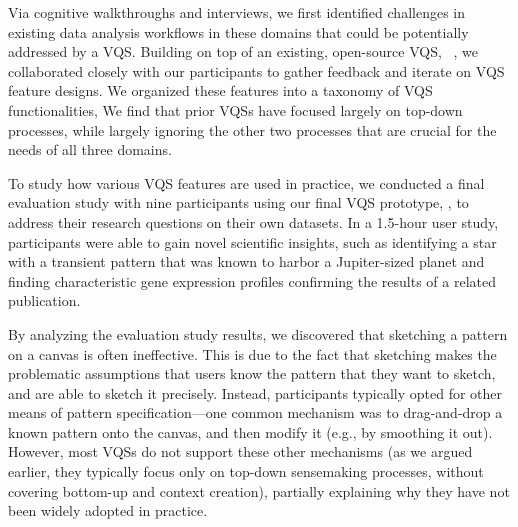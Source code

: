 \par Via cognitive walkthroughs and interviews, we first identified challenges in existing data analysis workflows in these domains
that could be potentially addressed by a VQS. Building on top of an existing, open-source VQS, \zv~\cite{Siddiqui2017,Siddiqui2017VLDB}, we collaborated closely with our participants to gather feedback and iterate on VQS feature designs. We organized these features into a taxonomy of VQS functionalities,  We find that prior VQSs have focused largely on top-down processes, while largely ignoring the other two processes that are crucial for the needs of all three domains.

\par 
To study how various VQS features 
are used in practice, 
we conducted a final evaluation study with nine participants 
using our final VQS prototype, \zvpp, 
to address their research questions 
on their own datasets. 
In a 1.5-hour user study, participants were able to 
gain novel scientific insights, 
such as identifying a star with a transient pattern 
that was known to harbor a Jupiter-sized planet 
and finding characteristic gene expression profiles confirming the results of a related publication.  

\par By analyzing the evaluation study results, 
we discovered that sketching a pattern on a canvas
is often ineffective. 
This is due to the fact that sketching makes the problematic
assumptions that 
users know the pattern that they want to sketch,
and are able to sketch it precisely. 
Instead, participants typically
opted for other means of pattern specification---one
common mechanism was to drag-and-drop a known pattern
onto the canvas,
and then modify it (e.g., by smoothing it out).
However, most VQSs do not support
these other mechanisms (as we argued earlier,
they typically focus only on top-down sensemaking processes,
without covering bottom-up and context creation), 
partially explaining
why they have not been widely adopted in practice.


